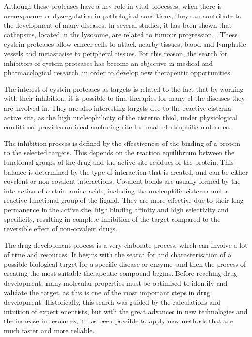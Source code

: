 \documentclass[final,times,twocolumn,article]{elsarticle}
\begin{document}
Although these proteases have a key role in vital processes, when there is overexposure or dysregulation in pathological conditions, they can contribute to the development of many diseases.  In several studies, it has been shown that cathepsins, located in the lysosome, are related to tumour progression. \cite{Berdowska2004} \cite{Mohamed2006}. These cystein proteases allow cancer cells to attack nearby tissues, blood and lymphatic vessels and metastasise to peripheral tissues. \cite{Gupta2020} \cite{Gocheva2006} For this reason, the search for inhibitors of cystein proteases has become an objective in medical and pharmacological research, in order to develop new therapeutic opportunities. \cite{cath}

The interest of cystein proteases as targets is related to the fact that by working with their inhibition, it is possible to find therapies for many of the diseases they are involved in. They are also interesting targets due to the reactive cisterna active site, as the high nucleophilicity of the cisterna thiol, under physiological conditions, provides an ideal anchoring site for small electrophilic molecules. \cite{Maurais2019} 

The inhibition process is defined by the effectiveness of the binding of a protein to the selected targets. This depends on the reaction equilibrium between the functional groups of the drug and the active site residues of the protein. This balance is determined by the type of interaction that is created, and can be either covalent or non-covalent interactions. 
Covalent bonds are usually formed by the interaction of certain amino acids, including the nucleophilic cisterna and a reactive functional group of the ligand. They are more effective due to their long permanence in the active site, high binding affinity and high selectivity and specificity, resulting in complete inhibition of the target compared to the reversible effect of non-covalent drugs. \cite{Aljoundi2020} 

The drug development process is a very elaborate process, which can involve a lot of time and resources. It begins with the search for and characterisation of a possible biological target for a specific disease or enzyme, and then the process of creating the most suitable therapeutic compound begins. Before reaching drug development, many molecular properties must be optimised to identify and validate the target, as this is one of the most important steps in drug development. \cite{Hughes2011}
Historically, this search was guided by the calculations and intuition of expert scientists, but with the great advances in new technologies and the increase in resources, it has been possible to apply new methods that are much faster and more reliable. \cite{Hop2018}
\end{document}
